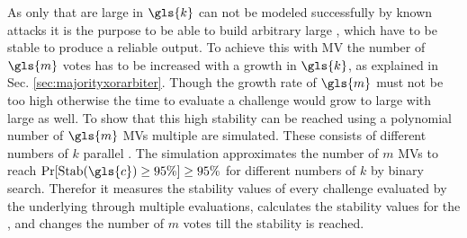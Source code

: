 As only \xpufs that are large in $\gls{k}$ can not be modeled successfully by known attacks it is the purpose to be able to build arbitrary large \xpufs, which have to be stable to produce a reliable output.
To achieve this with \ac{MV} the number of $\gls{m}$ votes has to be increased with a growth in $\gls{k}$, as explained in Sec. \ref{sec:majorityxorarbiter}.
Though the growth rate of $\gls{m}$ must not be too high otherwise the time to evaluate a challenge would grow to large with large \xpufs as well. %
To show that this high stability can be reached using a polynomial number of $\gls{m}$ \acp{MV} multiple \mxpufs are simulated.
These \mxpufs consists of different numbers of $k$ parallel \mpufs.
The simulation approximates the number of $m$ \acp{MV} to reach $\Pr[\protect\Stab(\gls{c}) \ge 95 \%] \ge 95 \%$ for different numbers of $k$ by binary search.
Therefor it measures the stability values of every challenge evaluated by the underlying \mpufs through multiple evaluations, calculates the stability values for the \mxpuf, and changes the number of $m$ votes till the stability is reached.

